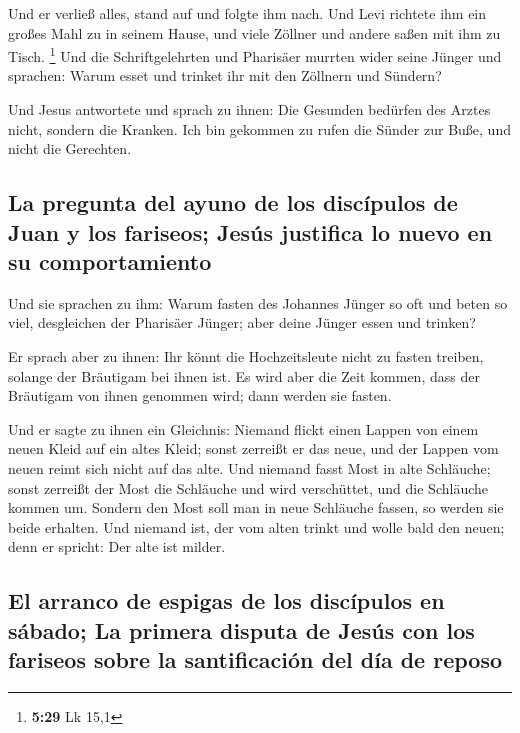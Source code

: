  Und er verließ alles, stand auf und folgte ihm nach.
 Und Levi richtete ihm ein großes Mahl zu in seinem
Hause, und viele Zöllner und andere saßen mit ihm zu Tisch. \footnote{\textbf{5:29}
  Lk 15,1}  Und die Schriftgelehrten und Pharisäer
murrten wider seine Jünger und sprachen: Warum esset und trinket ihr mit
den Zöllnern und Sündern?

 Und Jesus antwortete und sprach zu ihnen: Die Gesunden
bedürfen des Arztes nicht, sondern die Kranken.  Ich bin
gekommen zu rufen die Sünder zur Buße, und nicht die Gerechten.

\hypertarget{la-pregunta-del-ayuno-de-los-discuxedpulos-de-juan-y-los-fariseos-jesuxfas-justifica-lo-nuevo-en-su-comportamiento}{%
\subsection{La pregunta del ayuno de los discípulos de Juan y los
fariseos; Jesús justifica lo nuevo en su
comportamiento}\label{la-pregunta-del-ayuno-de-los-discuxedpulos-de-juan-y-los-fariseos-jesuxfas-justifica-lo-nuevo-en-su-comportamiento}}

 Und sie sprachen zu ihm: Warum fasten des Johannes
Jünger so oft und beten so viel, desgleichen der Pharisäer Jünger; aber
deine Jünger essen und trinken?

 Er sprach aber zu ihnen: Ihr könnt die Hochzeitsleute
nicht zu fasten treiben, solange der Bräutigam bei ihnen ist.
 Es wird aber die Zeit kommen, dass der Bräutigam von
ihnen genommen wird; dann werden sie fasten.

 Und er sagte zu ihnen ein Gleichnis: Niemand flickt
einen Lappen von einem neuen Kleid auf ein altes Kleid; sonst zerreißt
er das neue, und der Lappen vom neuen reimt sich nicht auf das alte.
 Und niemand fasst Most in alte Schläuche; sonst zerreißt
der Most die Schläuche und wird verschüttet, und die Schläuche kommen
um.  Sondern den Most soll man in neue Schläuche fassen,
so werden sie beide erhalten.  Und niemand ist, der vom
alten trinkt und wolle bald den neuen; denn er spricht: Der alte ist
milder.

\hypertarget{el-arranco-de-espigas-de-los-discuxedpulos-en-suxe1bado-la-primera-disputa-de-jesuxfas-con-los-fariseos-sobre-la-santificaciuxf3n-del-duxeda-de-reposo}{%
\subsection{El arranco de espigas de los discípulos en sábado; La
primera disputa de Jesús con los fariseos sobre la santificación del día
de
reposo}\label{el-arranco-de-espigas-de-los-discuxedpulos-en-suxe1bado-la-primera-disputa-de-jesuxfas-con-los-fariseos-sobre-la-santificaciuxf3n-del-duxeda-de-reposo}}

